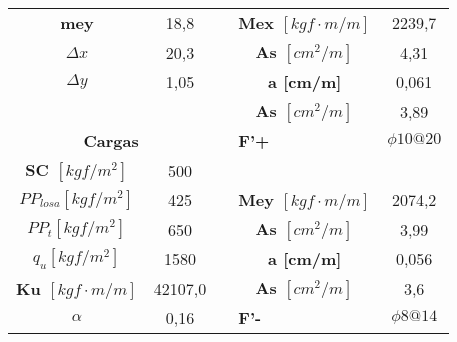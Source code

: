\begin{table}[H]
{\begin{tabular}{cccp{8.215em}c}
            \textbf{mey} & 18,8  &       & \multicolumn{1}{c}{\boldmath{}\textbf{Mex $[kgf \cdot m/m]$}\unboldmath{}} & 2239,7 \\
            \boldmath{}\textbf{$\Delta x$}\unboldmath{} & 20,3  &       & \multicolumn{1}{c}{\boldmath{}\textbf{As $[cm^2/m]$}\unboldmath{}} & 4,31 \\
            \boldmath{}\textbf{$\Delta y$}\unboldmath{} & 1,05  &       & \multicolumn{1}{c}{\textbf{a [cm/m]}} & 0,061 \\
                  &       &       & \multicolumn{1}{c}{\boldmath{}\textbf{As $[cm^2/m]$}\unboldmath{}} & 3,89 \bigstrut[b]\\
            \cline{1-2}\cline{4-5}    \multicolumn{2}{c}{\textbf{Cargas}} &       & \textbf{F'+} & \boldmath{}\textbf{$\phi10@20$}\unboldmath{} \bigstrut\\
            \cline{1-2}\cline{4-5}    \boldmath{}\textbf{SC $[kgf/m^2]$}\unboldmath{} & 500   &       & \multicolumn{1}{c}{} &  \bigstrut[t]\\
            \boldmath{}\textbf{$PP_{losa} [kgf/m^2]$}\unboldmath{} & 425   &       & \multicolumn{1}{c}{\boldmath{}\textbf{Mey $[kgf \cdot m/m]$}\unboldmath{}} & 2074,2 \\
            \boldmath{}\textbf{$PP_t [kgf/m^2]$}\unboldmath{} & 650   &       & \multicolumn{1}{c}{\boldmath{}\textbf{As $[cm^2/m]$}\unboldmath{}} & 3,99 \\
            \boldmath{}\textbf{$q_u [kgf/m^2]$}\unboldmath{} & 1580  &       & \multicolumn{1}{c}{\textbf{a [cm/m]}} & 0,056 \\
            \boldmath{}\textbf{Ku $[kgf \cdot m/m]$}\unboldmath{} & 42107,0 &       & \multicolumn{1}{c}{\boldmath{}\textbf{As $[cm^2/m]$}\unboldmath{}} & 3,6 \bigstrut[b]\\
            \cline{4-5}    \boldmath{}\textbf{$\alpha$}\unboldmath{} & 0,16  &       & \textbf{F'-} & \boldmath{}\textbf{$\phi8@14$}\unboldmath{} \bigstrut\\
            \hline
        \end{tabular}%
        }
        \label{analisis0101}%
    \end{table}%
    
